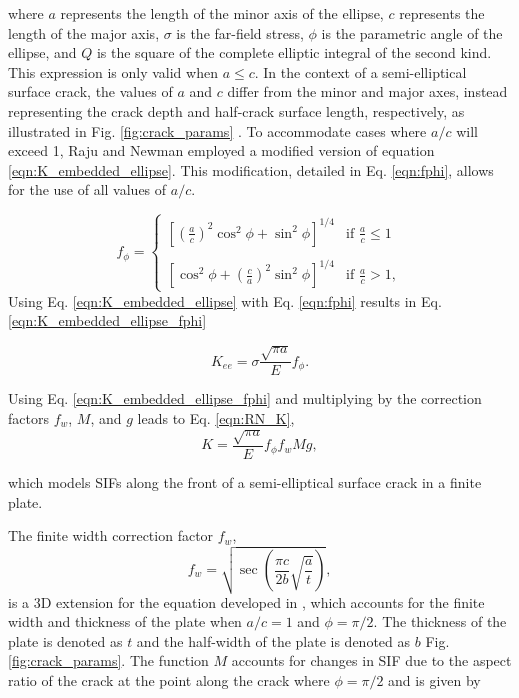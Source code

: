 where $a$ represents the length of the minor axis of the ellipse, $c$ represents the length of the major axis, $\sigma$ is the far-field stress, $\phi$ is the parametric angle of the ellipse, and $Q$ is the square of the complete elliptic integral of the second kind. This expression is only valid when $a \leq c$. In the context of a semi-elliptical surface crack, the values of $a$ and $c$ differ from the minor and major axes, instead representing the crack depth and half-crack surface length, respectively, as illustrated in Fig. \ref{fig:crack_params} \cite{tada1985}. To accommodate cases where $a/c$ will exceed 1, Raju and Newman employed a modified version of equation \ref{eqn:K_embedded_ellipse}. This modification, detailed in Eq. \ref{eqn:fphi}, allows for the use of all values of $a/c$.

\begin{equation} \label{eqn:fphi}
f_{\phi} = \begin{cases}
      \left[\left(\frac{a}{c}\right)^2 \cos^2\phi + \sin^2\phi\right]^{1/4} & \text{if } \frac{a}{c} \le 1 \\
      \\
      \left[\cos^2\phi + \left(\frac{c}{a}\right)^2\sin^2\phi\right]^{1/4} & \text{if } \frac{a}{c} > 1,
    \end{cases}
\end{equation}
 Using Eq. \ref{eqn:K_embedded_ellipse} with Eq. \ref{eqn:fphi} results in Eq. \ref{eqn:K_embedded_ellipse_fphi}

\begin{equation} \label{eqn:K_embedded_ellipse_fphi}
    K_{ee} = \sigma \frac{\sqrt{\pi a}}{E} f_{\phi}.
\end{equation}

 Using Eq. \ref{eqn:K_embedded_ellipse_fphi} and multiplying by the correction factors $f_w$, $M$, and $g$ leads to Eq. \ref{eqn:RN_K},
 \begin{equation} \label{eqn:RN_K}
     K = \frac{\sqrt{\pi a}}{E} f_{\phi} f_w M g,
 \end{equation} 

which models SIFs along the front of a semi-elliptical surface crack in a finite plate.

The finite width correction factor $f_w$,
\begin{equation} \label{eqn:RN_fw}
    f_w = \sqrt{\sec\left(\frac{\pi c}{2b}\sqrt{\frac{a}{t}}\right)},
\end{equation}
 is a 3D extension for the equation developed in \cite{brown1966}, which accounts for the finite width and thickness of the plate when $a/c = 1$ and $\phi = \pi/2$. The thickness of the plate is denoted as $t$ and the half-width of the plate is denoted as $b$ Fig. \ref{fig:crack_params}. The function $M$ accounts for changes in SIF due to the aspect ratio of the crack at the point along the crack where $\phi = \pi/2$ and is given by
 
